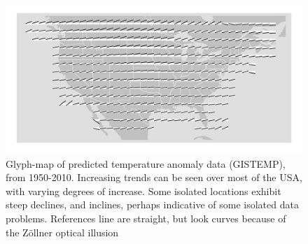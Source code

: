 \documentclass[oneside]{article}
\begin{document}
\begin{figure}[htbp]
  \centering
  \includegraphics[width=1\linewidth]{gistemp-pred}%

  \caption{Glyph-map of predicted temperature anomaly data (GISTEMP), from
    1950-2010. Increasing trends can be seen over most of the USA,
    with varying degrees of increase. Some isolated locations exhibit
    steep declines, and inclines, perhaps indicative of some isolated
    data problems. References line are straight, but look curves because of
    the Z\"ollner optical illusion}
  \label{fig:gistemp-pred}
\end{figure}

\end{document}
